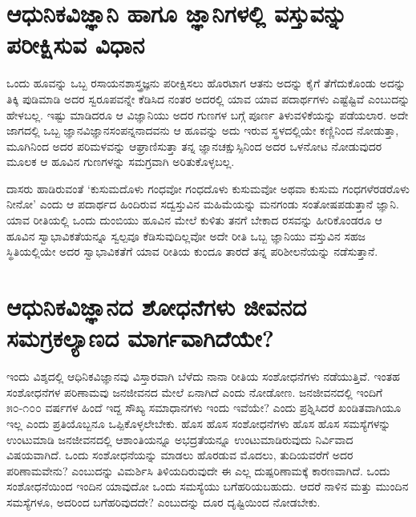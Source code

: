 \section*{ಆಧುನಿಕವಿಜ್ಞಾನಿ ಹಾಗೂ ಜ್ಞಾನಿಗಳಲ್ಲಿ ವಸ್ತುವನ್ನು ಪರೀಕ್ಷಿಸುವ ವಿಧಾನ}

ಒಂದು ಹೂವನ್ನು ಒಬ್ಬ ರಸಾಯನಶಾಸ್ತ್ರಜ್ಞನು ಪರೀಕ್ಷಿಸಲು ಹೊರಟಾಗ ಆತನು ಅದನ್ನು ಕೈಗೆ ತೆಗೆದುಕೊಂಡು ಅದನ್ನು ತಿಕ್ಕಿ ಪುಡಿಮಾಡಿ ಅದರ ಸ್ವರೂಪವನ್ನೇ ಕೆಡಿಸಿದ ನಂತರ ಅದರಲ್ಲಿ ಯಾವ ಯಾವ ಪದಾರ್ಥಗಳು ಎಷ್ಟೆಷ್ಟಿವೆ ಎಂಬುದನ್ನು ಹೇಳಬಲ್ಲ. ಇಷ್ಟು ಮಾಡಿದರೂ ಆ ವಿಜ್ಞಾನಿಯು ಅದರ ಗುಣಗಳ ಬಗ್ಗೆ ಪೂರ್ಣ ತಿಳುವಳಿಕೆಯನ್ನು ಪಡೆಯಲಾರ. ಅದೇ ಜಾಗದಲ್ಲಿ ಒಬ್ಬ ಜ್ಞಾನವಿಜ್ಞಾನಸಂಪನ್ನನಾದವನು ಆ ಹೂವನ್ನು ಅದು ಇರುವ ಸ್ಥಳದಲ್ಲಿಯೇ ಕಣ್ಣಿನಿಂದ ನೋಡುತ್ತಾ, ಮೂಗಿನಿಂದ ಅದರ ಪರಿಮಳವನ್ನು ಆಘ್ರಾಣಿಸುತ್ತಾ ತನ್ನ ಜ್ಞಾನಚಕ್ಷುಸ್ಸಿನಿಂದ ಅದರ ಒಳನೋಟ ನೋಡುವುದರ ಮೂಲಕ ಆ ಹೂವಿನ ಗುಣಗಳನ್ನು ಸಮಗ್ರವಾಗಿ ಅರಿತುಕೊಳ್ಳಬಲ್ಲ.

ದಾಸರು ಹಾಡಿರುವಂತೆ `ಕುಸುಮದೊಳು ಗಂಧವೋ ಗಂಧದೊಳು ಕುಸುಮವೋ ಅಥವಾ ಕುಸುಮ ಗಂಧಗಳೆರಡರೊಳು ನೀನೋ' ಎಂದು ಆ ಪದಾರ್ಥದ ಹಿಂದಿರುವ ಸದ್ವಸ್ತುವಿನ ಮಹಿಮೆಯನ್ನು ಮನಗಂಡು ಸಂತೋಷಪಡುತ್ತಾನೆ ಜ್ಞಾನಿ. ಯಾವ ರೀತಿಯಲ್ಲಿ ಒಂದು ದುಂಬಿಯು ಹೂವಿನ ಮೇಲೆ ಕುಳಿತು ತನಗೆ ಬೇಕಾದ ರಸವನ್ನು ಹೀರಿಕೊಂಡರೂ ಆ ಹೂವಿನ ಸ್ವಾಭಾವಿಕತೆಯನ್ನೂ ಸ್ವಲ್ಪವೂ ಕೆಡಿಸುವುದಿಲ್ಲವೋ ಅದೇ ರೀತಿ ಒಬ್ಬ ಜ್ಞಾನಿಯು ವಸ್ತುವಿನ ಸಹಜ ಸ್ಥಿತಿಯಲ್ಲಿಯೇ ಅದರ ಸ್ವಾಭಾವಿಕತೆಗೆ ಯಾವ ರೀತಿಯ ಕುಂದೂ ತಾರದೆ ತನ್ನ ಪರಿಶೀಲನೆಯನ್ನು ನಡೆಸುತ್ತಾನೆ.

\section*{ಆಧುನಿಕವಿಜ್ಞಾನದ ಶೋಧನೆಗಳು ಜೀವನದ ಸಮಗ್ರಕಲ್ಯಾಣದ ಮಾರ್ಗವಾಗಿದೆಯೇ?}

ಇಂದು ವಿಶ್ಶದಲ್ಲಿ ಆಧಿನಿಕವಿಜ್ಞಾನವು ವಿಸ್ತಾರವಾಗಿ ಬೆಳೆದು ನಾನಾ ರೀತಿಯ ಸಂಶೋಧನೆಗಳು ನಡೆಯುತ್ತಿವೆ. ಇಂತಹ ಸಂಶೋಧನೆಗಳ ಪರಿಣಾಮವು ಜನಜೀವನದ ಮೇಲೆ ಏನಾಗಿದೆ ಎಂದು ನೋಡೋಣ. ಜನಜೀವನದಲ್ಲಿ ಇಂದಿಗೆ ೫೦-೧೦೦ ವರ್ಷಗಳ ಹಿಂದೆ ಇದ್ದ ಸೌಖ್ಯ ಸಮಾಧಾನಗಳು ಇಂದು ಇವೆಯೇ? ಎಂದು ಪ್ರಶ್ನಿಸಿದರೆ ಖಂಡಿತವಾಗಿಯೂ ಇಲ್ಲ ಎಂದು ಪ್ರತಿಯೊಬ್ಬನೂ ಒಪ್ಪಿಕೊಳ್ಳಲೇಬೇಕು. ಹೊಸ ಹೊಸ ಸಂಶೋಧನೆಗಳು ಹೊಸ ಹೊಸ ಸಮಸ್ಯೆಗಳನ್ನು ಉಂಟುಮಾಡಿ ಜನಜೀವನದಲ್ಲಿ ಆಶಾಂತಿಯನ್ನೂ ಅಭದ್ರತೆಯನ್ನೂ ಉಂಟುಮಾಡಿರುವುದು ನಿರ್ವಿವಾದ ವಿಷಯವಾಗಿದೆ. ಒಂದು ಸಂಶೋಧನೆಯನ್ನು ಮಾಡಲು ಹೊರಡುವ ಮೊದಲು, ತುದಿಯವರೆಗೆ ಅದರ ಪರಿಣಾಮವೇನು? ಎಂಬುದನ್ನು ವಿಮರ್ಶಿಸಿ ತಿಳಿಯದಿರುವುದೇ ಈ ಎಲ್ಲ ದುಷ್ಪರಿಣಾಮಕ್ಕೆ ಕಾರಣವಾಗಿದೆ. ಒಂದು ಸಂಶೋಧನೆಯಿಂದ ಇಂದಿನ ಯಾವುದೋ ಒಂದು ಸಮಸ್ಯೆಯು ಬಗೆಹರಿಯಬಹುದು. ಆದರೆ ನಾಳಿನ ಮತ್ತು ಮುಂದಿನ ಸಮಸ್ಯೆಗಳೂ, ಅದರಿಂದ ಬಗೆಹರಿವುದದೇ? ಎಂಬುದನ್ನು ದೂರ ದೃಷ್ಟಿಯಿಂದ ನೋಡಬೇಕು.

